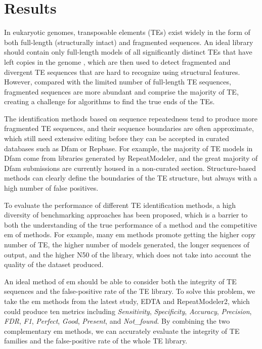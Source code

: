 \documentclass{bmcart}
\begin{document}
\section*{Results}
In eukaryotic genomes, transposable elements (TEs) exist widely in the form of both full-length (structurally intact) and fragmented sequences. An ideal library should contain only full-length models of all significantly distinct TEs that have left copies in the genome \cite{storer2022methodologies}, which are then used to detect fragmented and divergent TE sequences that are hard to recognize using structural features. However, compared with the limited number of full-length TE sequences, fragmented sequences are more abundant and comprise the majority of TE, creating a challenge for algorithms to find the true ends of the TEs.

The identification methods based on sequence repeatedness tend to produce more fragmented TE sequences, and their sequence boundaries are often approximate, which still need extensive editing before they can be accepted in curated databases such as Dfam or Repbase. For example, the majority of TE models in Dfam come from libraries generated by RepeatModeler, and the great majority of Dfam submissions are currently housed in a non-curated section\cite{storer2021dfam}. Structure-based methods can clearly define the boundaries of the TE structure, but always with a high number of false positives.

To evaluate the performance of different TE identification methods, a high diversity of benchmarking approaches has been proposed, which is a barrier to both the understanding of the true performance of a method and the competitive em of methods. For example, many em methods promote getting the higher copy number of TE, the higher number of models generated, the longer sequences of output, and the higher N50 of the library, which does not take into account the quality of the dataset produced\cite{storer2022methodologies}.

An ideal method of em should be able to consider both the integrity of TE sequences and the false-positive rate of the TE library. To solve this problem, we take the em methods from the latest study, EDTA\cite{ou2019benchmarking} and RepeatModeler2\cite{flynn2020repeatmodeler2}, which could produce ten metrics including \emph{Sensitivity}, \emph{Specificity}, \emph{Accuracy}, \emph{Precision}, \emph{FDR}, \emph{F1}, \emph{Perfect}, \emph{Good}, \emph{Present}, and \emph{Not\_found}. By combining the two complementary em methods, we can accurately evaluate the integrity of TE families and the false-positive rate of the whole TE library.
\end{document}
